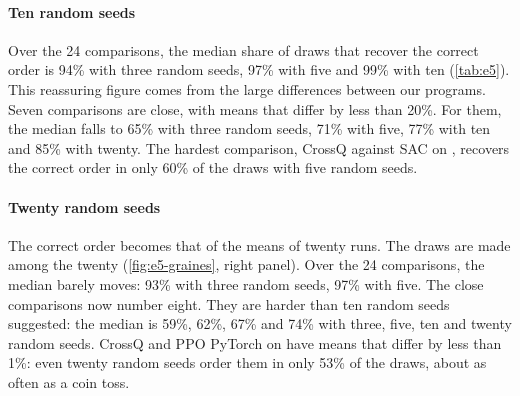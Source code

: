 \paragraph{Ten random seeds}
Over the 24 comparisons, the median share of draws that recover the correct order is 94\% with three random
seeds, 97\% with five and 99\% with ten (\cref{tab:e5}). This reassuring figure comes from the large
differences between our programs. Seven comparisons are close, with means that differ by less than 20\%. For them, the
median falls to 65\% with three random seeds, 71\% with five, 77\% with ten and 85\% with twenty. The hardest
comparison, CrossQ against SAC on , recovers the correct order in only 60\% of the draws with
five random seeds.


\paragraph{Twenty random seeds}
The correct order becomes that of the means of twenty runs. The draws are made among the twenty (\cref{fig:e5-graines}, right panel). Over the
24 comparisons, the median barely moves: 93\% with three random seeds, 97\% with five. The close comparisons
now number eight. They are harder than ten random seeds suggested: the median is 59\%, 62\%, 67\% and 74\%
with three, five, ten and twenty random seeds. CrossQ and PPO PyTorch on  have means that differ
by less than 1\%: even twenty random seeds order them in only 53\% of the draws, about as often as a coin
toss.


